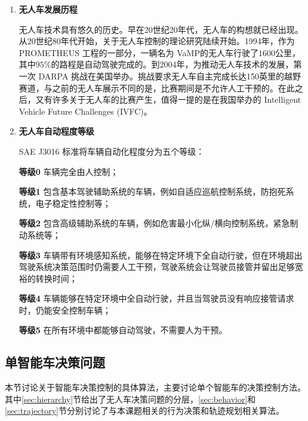 \begin{enumerate}[wide=\parindent]
\item \textbf{无人车发展历程}

无人车技术具有悠久的历史。早在20世纪20年代，无人车的构想就已经出现\cite{Adrienne2016Your}。从20世纪80年代开始，关于无人车控制的理论研究陆续开始\cite{Dickmanns1988Dynamic}。1994年，作为 PROMETHEUS 工程\cite{eureka2016}的一部分，一辆名为 VaMP的无人车\cite{vamp2017}行驶了$1600$公里，其中$95\%$的路程是自动驾驶完成的。到2004年，为推动无人车技术的发展，第一次 DARPA 挑战在美国举办。挑战要求无人车自主完成长达150英里的越野赛道，与之前的无人车展示不同的是，比赛期间是不允许人工干预的。在此之后，又有许多关于无人车的比赛产生，值得一提的是在我国举办的 Intelligent Vehicle Future Challenges (IVFC)\cite{Xin2014China}。

\item \textbf{无人车自动程度等级}

SAE J3016 标准\cite{SO2014Taxonomy}将车辆自动化程度分为五个等级：

\textbf{等级0} 车辆完全由人控制；

\textbf{等级1} 包含基本驾驶辅助系统的车辆，例如自适应巡航控制系统，防抱死系统，电子稳定性控制\cite{Rajamani2011Vehicle}等；

\textbf{等级2} 包含高级辅助系统的车辆，例如危害最小化纵/横向控制系统\cite{Gerdes2001A}，紧急制动系统\cite{Brannstrom2010Model,Vahidi2003Research}等；

\textbf{等级3} 车辆带有环境感知系统，能够在特定环境下全自动行驶，但在环境超出驾驶系统决策范围时仍需要人工干预，驾驶系统会让驾驶员接管并留出足够宽裕的转换时间；

\textbf{等级4} 车辆能够在特定环境中全自动行驶，并且当驾驶员没有响应接管请求时，仍能安全控制车辆；

\textbf{等级5} 在所有环境中都能够自动驾驶，不需要人为干预。

\end{enumerate}

\subsection{单智能车决策问题}
\label{sec:single}
本节讨论关于智能车决策控制的具体算法，主要讨论单个智能车的决策控制方法。其中\ref{sec:hierarchy}节给出了无人车决策问题的分层，\ref{sec:behavior}和\ref{sec:trajectory}节分别讨论了与本课题相关的行为决策和轨迹规划相关算法。

